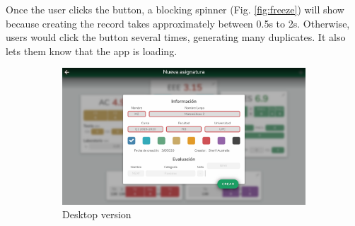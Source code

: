 Once the user clicks the  button, a blocking spinner (Fig. \ref{fig:freeze}) will show because creating the record takes approximately between 0.5s to 2s. Otherwise, users would click the button several times, generating many duplicates. It also lets them know that the app is loading.

\vfill
\begin{figure}[ht!]
    \begin{subfigure}[b]{0.757\textwidth-0.1cm}
        \centering
        \includegraphics[width=\textwidth]{media/screenshots/screenshot-create-pc.png}
        \caption{Desktop version}
    \end{subfigure}
    \hfill
    \begin{subfigure}[b]{0.243\textwidth-0.1cm}
        \centering

\end{subfigure}
\end{figure}
